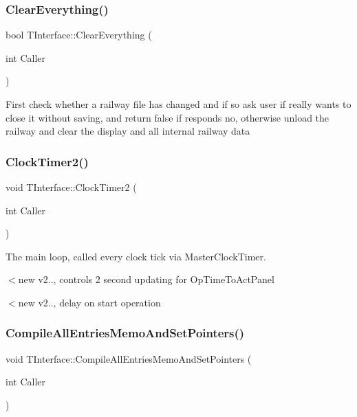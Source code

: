 \subsubsection{\texorpdfstring{Clear\+Everything()}{ClearEverything()}}
{\footnotesize\ttfamily bool T\+Interface\+::\+Clear\+Everything (\begin{DoxyParamCaption}\item[{int}]{Caller }\end{DoxyParamCaption})\hspace{0.3cm}{\ttfamily [private]}}

First check whether a railway file has changed and if so ask user if really wants to close it without saving, and return false if responds no, otherwise unload the railway and clear the display and all internal railway data \mbox{\label{class_t_interface_a6139ffb52492eb89e5487a8a3cd647b5}} 
\subsubsection{\texorpdfstring{Clock\+Timer2()}{ClockTimer2()}}
{\footnotesize\ttfamily void T\+Interface\+::\+Clock\+Timer2 (\begin{DoxyParamCaption}\item[{int}]{Caller }\end{DoxyParamCaption})\hspace{0.3cm}{\ttfamily [private]}}



The main loop, called every clock tick via Master\+Clock\+Timer. 

$<$new v2.., controls 2 second updating for Op\+Time\+To\+Act\+Panel

$<$new v2.., delay on start operation \mbox{\label{class_t_interface_a330394a04433ce8672a52c2a0a659ff0}} 
\subsubsection{\texorpdfstring{Compile\+All\+Entries\+Memo\+And\+Set\+Pointers()}{CompileAllEntriesMemoAndSetPointers()}}
{\footnotesize\ttfamily void T\+Interface\+::\+Compile\+All\+Entries\+Memo\+And\+Set\+Pointers (\begin{DoxyParamCaption}\item[{int}]{Caller }\end{DoxyParamCaption})\hspace{0.3cm}{\ttfamily [private]}}

